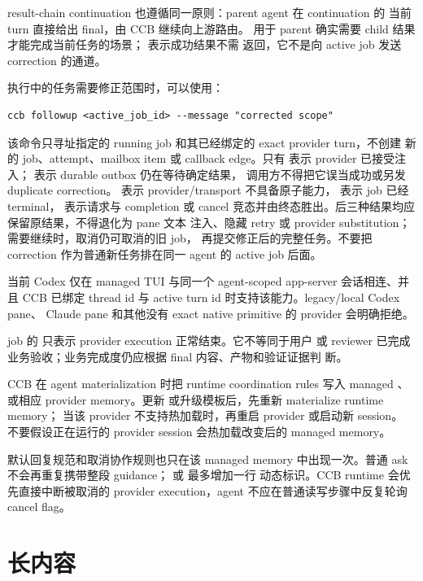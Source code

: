 result-chain continuation 也遵循同一原则：parent agent 在 continuation 的
当前 turn 直接给出 final，由 CCB 继续向上游路由。 用于 parent
确实需要 child 结果才能完成当前任务的场景； 表示成功结果不需
返回，它不是向 active job 发送 correction 的通道。

执行中的任务需要修正范围时，可以使用：

\begin{lstlisting}
ccb followup <active_job_id> --message "corrected scope"
\end{lstlisting}

该命令只寻址指定的 running job 和其已经绑定的 exact provider turn，不创建
新的 job、attempt、mailbox item 或 callback edge。只有  表示
provider 已接受注入； 表示 durable outbox 仍在等待确定结果，
调用方不得把它误当成功或另发 duplicate correction。 表示
provider/transport 不具备原子能力，
 表示 job 已经 terminal， 表示请求与 completion
或 cancel 竞态并由终态胜出。后三种结果均应保留原结果，不得退化为 pane 文本
注入、隐藏 retry 或 provider substitution；需要继续时，取消仍可取消的旧 job，
再提交修正后的完整任务。不要把 correction 作为普通新任务排在同一 agent 的
active job 后面。

当前 Codex 仅在 managed TUI 与同一个 agent-scoped app-server 会话相连、并且
CCB 已绑定 thread id 与 active turn id 时支持该能力。legacy/local Codex pane、
Claude pane 和其他没有 exact native primitive 的 provider 会明确拒绝。

job 的  只表示 provider execution 正常结束。它不等同于用户
或 reviewer 已完成业务验收；业务完成度仍应根据 final 内容、产物和验证证据判
断。

CCB 在 agent materialization 时把 runtime coordination rules 写入 managed
、 或相应 provider memory。更新
 或升级模板后，先重新 materialize runtime memory；
当该 provider 不支持热加载时，再重启 provider 或启动新 session。
不要假设正在运行的 provider session 会热加载改变后的 managed memory。

默认回复规范和取消协作规则也只在该 managed memory 中出现一次。普通 ask
不会再重复携带整段 guidance； 或  最多增加一行
 动态标识。CCB runtime 会优先直接中断被取消的 provider
execution，agent 不应在普通读写步骤中反复轮询 cancel flag。

\section{长内容}

